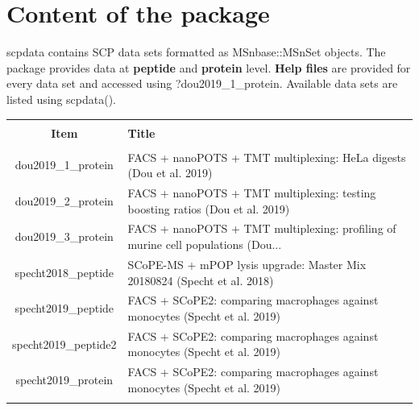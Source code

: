 \documentclass{article}
\newcommand{\hcode}[2][lgray]{{\ttfamily\color{vdgray}\colorbox{#1}{#2}}}
\begin{document}
\begin{multicols}{2}
\begin{minipage}[t]{\linewidth}
  \begin{center}
  \end{center}
  
\end{minipage}

\noindent
\begin{minipage}[t]{\linewidth}
  \vspace{0.55cm}
  \section*{\huge Content of the package}
  
  \large
  \hcode{scpdata} contains SCP data sets formatted as \hcode{MSnbase::MSnSet} objects. The package provides data at \textbf{peptide} and \textbf{protein} level. \textbf{Help files} are provided for every data set and accessed using \hcode{?dou2019\_1\_protein}. Available data sets are listed using \hcode{scpdata()}.
  
  \scriptsize
  \begin{tabular}{@{\extracolsep{5pt}} cl} 
    \\[-1.8ex]\hline 
    \hline \\[-1.8ex] 
    \textbf{Item} & \textbf{Title} \\ 
    \hline \\[-1.8ex] 
    dou2019\_1\_protein & FACS + nanoPOTS + TMT multiplexing: HeLa digests (Dou et al. 2019) \\ 
    dou2019\_2\_protein & FACS + nanoPOTS + TMT multiplexing: testing boosting ratios (Dou et al. 2019) \\ 
    dou2019\_3\_protein & FACS + nanoPOTS + TMT multiplexing: profiling of murine cell populations (Dou... \\
    specht2018\_peptide & SCoPE-MS + mPOP lysis upgrade: Master Mix 20180824 (Specht et al. 2018) \\ 
    specht2019\_peptide & FACS + SCoPE2: comparing macrophages against monocytes (Specht et al. 2019) \\ 
    specht2019\_peptide2 & FACS + SCoPE2: comparing macrophages against monocytes (Specht et al. 2019) \\ 
    specht2019\_protein & FACS + SCoPE2: comparing macrophages against monocytes (Specht et al. 2019) \\ 
    \hline \\[-1.8ex] 
  \end{tabular} 
  

\end{minipage}
\end{multicols}
\end{document}
